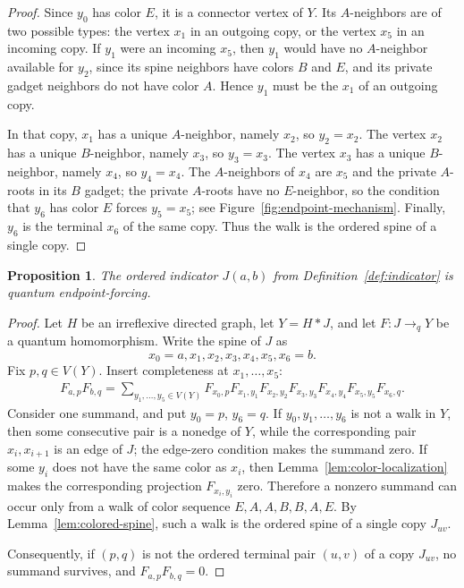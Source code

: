 \documentclass[11pt]{amsart}
\theoremstyle{plain}
\newtheorem{proposition}[theorem]{Proposition}
\theoremstyle{definition}
\newcommand{\toq}{\to_q}
\begin{document}
\begin{proof}
Since $y_0$ has color $E$, it is a connector vertex of $Y$.  Its $A$-neighbors are of two possible types: the vertex $x_1$ in an outgoing copy, or the vertex $x_5$ in an incoming copy.  If $y_1$ were an incoming $x_5$, then $y_1$ would have no $A$-neighbor available for $y_2$, since its spine neighbors have colors $B$ and $E$, and its private gadget neighbors do not have color $A$.  Hence $y_1$ must be the $x_1$ of an outgoing copy.

In that copy, $x_1$ has a unique $A$-neighbor, namely $x_2$, so $y_2=x_2$.  The vertex $x_2$ has a unique $B$-neighbor, namely $x_3$, so $y_3=x_3$.  The vertex $x_3$ has a unique $B$-neighbor, namely $x_4$, so $y_4=x_4$.  The $A$-neighbors of $x_4$ are $x_5$ and the private $A$-roots in its $B$ gadget; the private $A$-roots have no $E$-neighbor, so the condition that $y_6$ has color $E$ forces $y_5=x_5$; see Figure~\ref{fig:endpoint-mechanism}.  Finally, $y_6$ is the terminal $x_6$ of the same copy.  Thus the walk is the ordered spine of a single copy.
\end{proof}

\begin{proposition}\label{prop:endpoint-forcing}
The ordered indicator $J(a,b)$ from Definition~\ref{def:indicator} is quantum endpoint-forcing.
\end{proposition}

\begin{proof}
Let $H$ be an irreflexive directed graph, let $Y=H*J$, and let $F:J\toq Y$ be a quantum homomorphism.  Write the spine of $J$ as
\[
   x_0=a,x_1,x_2,x_3,x_4,x_5,x_6=b.
\]
Fix $p,q\in V(Y)$.  Insert completeness at $x_1,\ldots,x_5$:
\[
\begin{aligned}
   F_{a,p}F_{b,q}
   =\sum_{y_1,\ldots,y_5\in V(Y)}
     F_{x_0,p}F_{x_1,y_1}F_{x_2,y_2}F_{x_3,y_3}
     F_{x_4,y_4}F_{x_5,y_5}F_{x_6,q}.
\end{aligned}
\]
Consider one summand, and put $y_0=p$, $y_6=q$.  If $y_0,y_1,\ldots,y_6$ is not a walk in $Y$, then some consecutive pair is a nonedge of $Y$, while the corresponding pair $x_i,x_{i+1}$ is an edge of $J$; the edge-zero condition makes the summand zero.  If some $y_i$ does not have the same color as $x_i$, then Lemma~\ref{lem:color-localization} makes the corresponding projection $F_{x_i,y_i}$ zero.  Therefore a nonzero summand can occur only from a walk of color sequence $E,A,A,B,B,A,E$.  By Lemma~\ref{lem:colored-spine}, such a walk is the ordered spine of a single copy $J_{uv}$.

Consequently, if $(p,q)$ is not the ordered terminal pair $(u,v)$ of a copy $J_{uv}$, no summand survives, and $F_{a,p}F_{b,q}=0$.
\end{proof}
\end{document}

